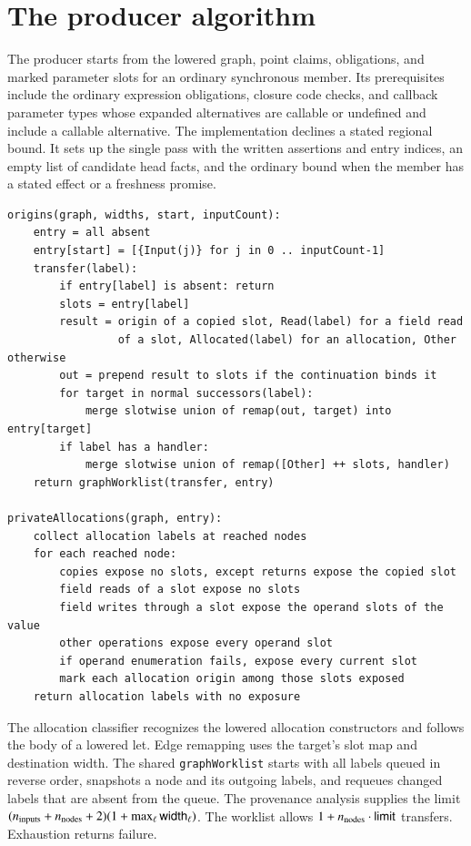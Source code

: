 \documentclass[10pt,a4paper]{article}
\theoremstyle{definition}
\newcommand{\lean}[1]{\textcolor{leanc}{\texttt{\small #1}}}
\begin{document}
\section{The producer algorithm}\label{sec:producer}

The producer starts from the lowered graph, point claims,
obligations, and marked parameter slots for an ordinary synchronous
member. Its prerequisites include the ordinary expression
obligations, closure code checks, and callback parameter types
whose expanded alternatives are callable or undefined and include
a callable alternative. The implementation declines a stated
regional bound. It sets up the single pass with the written
assertions and entry indices, an empty list of candidate
head facts, and the ordinary bound when the member has a
stated effect or a freshness promise.

\begin{lstlisting}[language=Pseudocode]
origins(graph, widths, start, inputCount):
    entry = all absent
    entry[start] = [{Input(j)} for j in 0 .. inputCount-1]
    transfer(label):
        if entry[label] is absent: return
        slots = entry[label]
        result = origin of a copied slot, Read(label) for a field read
                 of a slot, Allocated(label) for an allocation, Other otherwise
        out = prepend result to slots if the continuation binds it
        for target in normal successors(label):
            merge slotwise union of remap(out, target) into entry[target]
        if label has a handler:
            merge slotwise union of remap([Other] ++ slots, handler)
    return graphWorklist(transfer, entry)

privateAllocations(graph, entry):
    collect allocation labels at reached nodes
    for each reached node:
        copies expose no slots, except returns expose the copied slot
        field reads of a slot expose no slots
        field writes through a slot expose the operand slots of the value
        other operations expose every operand slot
        if operand enumeration fails, expose every current slot
        mark each allocation origin among those slots exposed
    return allocation labels with no exposure
\end{lstlisting}

The allocation classifier recognizes the lowered allocation
constructors and follows the body of a lowered let. Edge remapping
uses the target's slot map and destination width. The shared
\lean{graphWorklist} starts with all labels queued in reverse
order, snapshots a node and its outgoing labels, and requeues
changed labels that are absent from the queue. The provenance
analysis supplies the limit
$(n_{\rm inputs}+n_{\rm nodes}+2)(1+\max_\ell\mathsf{width}_\ell)$.
The worklist allows $1+n_{\rm nodes}\cdot\mathsf{limit}$ transfers.
Exhaustion returns failure.
\end{document}
